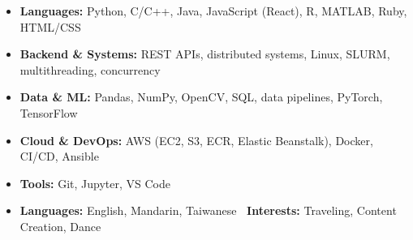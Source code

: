 \documentclass[10pt,letterpaper]{article}
\newcommand{\ResumeSectionSize}{12}
\newcommand{\ResumeSectionLeading}{12.0}
\newcommand{\ResumeSkillsSpaceBefore}{8pt}
\newcommand{\ResumeSkillsSpaceAfter}{2pt}
\newcommand{\ResumeSkillsLabelSep}{4pt}
\newcommand{\ResumeSkillsTopSep}{0pt}
\newcommand{\ResumeSkillsBottomSep}{0pt}
\newcommand{\ResumeSkillsItemSep}{1pt}
\newcommand{\ResumeSkillsParsep}{0pt}
\newcommand{\sectionfont}{\fontsize{\ResumeSectionSize}{\ResumeSectionLeading}\selectfont\bfseries}
\newcommand{\resumesectionheading}[3]{%
  \vspace{#1}%
  \noindent{\sectionfont #2}\par
  \vspace{#3}%
}
\newenvironment{skills}[1][SKILLS:]{%
  \resumesectionheading{\ResumeSkillsSpaceBefore}{#1}{\ResumeSkillsSpaceAfter}%
  \begin{itemize}[
    leftmargin=*,
    labelsep=\ResumeSkillsLabelSep,
    topsep=\ResumeSkillsTopSep,
    partopsep=0pt,
    parsep=\ResumeSkillsParsep,
    itemsep=\ResumeSkillsItemSep,
    label=\textbullet
  ]
}{%
  \end{itemize}%
  \vspace{\ResumeSkillsBottomSep}%
}
\newcommand{\skillitem}[2]{\item {\bfseries #1} #2}
\newcommand{\skilldual}[4]{%
  \item {\bfseries #1} #2 \hfill {\bfseries \textbullet\ #3} #4%
}
\begin{document}
\begin{skills}
  \skillitem{Languages:}{Python, C/C++, Java, JavaScript (React), R, MATLAB, Ruby, HTML/CSS}
  \skillitem{Backend \& Systems:}{REST APIs, distributed systems, Linux, SLURM, multithreading, concurrency}
  \skillitem{Data \& ML:}{Pandas, NumPy, OpenCV, SQL, data pipelines, PyTorch, TensorFlow}
  \skillitem{Cloud \& DevOps:}{AWS (EC2, S3, ECR, Elastic Beanstalk), Docker, CI/CD, Ansible}
  \skillitem{Tools:}{Git, Jupyter, VS Code}
  \skilldual{Languages:}{English, Mandarin, Taiwanese}{Interests:}{Traveling, Content Creation, Dance}
\end{skills}
\end{document}
